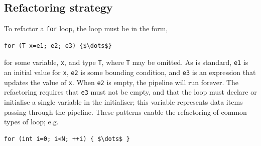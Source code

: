 
%

\subsection{Refactoring strategy}\label{refactoring-strategy}

To refactor a \texttt{for} loop, the loop must be in the form,
% 
\begin{lstlisting}[mathescape]
for (T x=e1; e2; e3) {$\dots$}
\end{lstlisting}

\noindent
for some variable, \texttt{x}, and type \texttt{T}, where \texttt{T} may be omitted.
As is standard,
\texttt{e1} is an initial value for \texttt{x}, \texttt{e2} is some
bounding condition, and \texttt{e3} is an expression that updates the
value of \texttt{x}. When \texttt{e2} is empty, the
pipeline will run forever. The refactoring requires that \texttt{e3} must not be empty,
and that the
loop must declare or initialise a
single variable in the initialiser; this variable represents data
items passing through the pipeline.
% 
These patterns enable the refactoring of common types of loop; e.g.
\begin{lstlisting}[mathescape]
for (int i=0; i<N; ++i) { $\dots$ }
\end{lstlisting}

